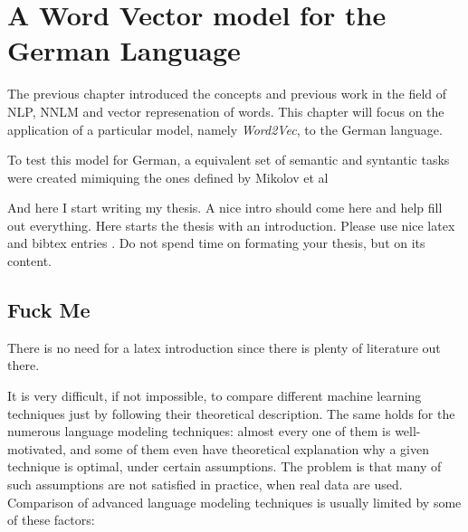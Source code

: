 \chapter{A Word Vector model for the German Language}
\label{chapter:wor2vec_german}










The previous chapter introduced the concepts and previous work in the field
of  \ac{NLP}, \ac{NNLM} and vector represenation of words. This chapter will
focus on the application of a particular model, namely \textit{Word2Vec}, to
the German language. 

To test this model for  German,  a equivalent set of semantic and
syntantic tasks were created mimiquing  the ones defined by Mikolov et al 

And here I start writing my thesis. A nice intro should come here and help
fill out everything.
Here starts the thesis with an introduction. Please use nice latex and bibtex entries \cite{latex}. Do not spend time on formating your thesis, but on its content. 
 

\section{Fuck Me}



There is no need for a latex introduction since there is plenty of literature out there.


It is very difficult, if not impossible, to compare different machine learning techniques just by following their theoretical description. The same holds for the numerous language modeling techniques: almost every one of them is well-motivated, and some of them even have theoretical explanation why a given technique is optimal, under certain assumptions. The problem is that many of such assumptions are not satisfied in practice, when real data are used.
Comparison of advanced language modeling techniques is usually limited by some of these factors:

